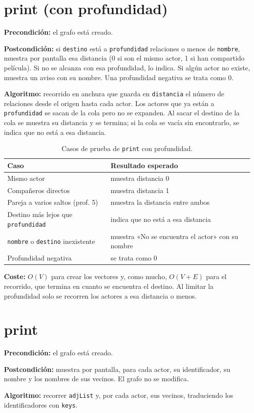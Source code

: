 \documentclass[a4paper,11pt]{report}
\newcommand{\coste}[1]{\par\noindent\textbf{Coste:} #1\par}
\newcommand{\espec}[2]{\par\noindent\textbf{Precondición:} #1\par\noindent\textbf{Postcondición:} #2\par}
\newcommand{\algoritmo}[1]{\par\noindent\textbf{Algoritmo:} #1\par}
\begin{document}
\section{\label{printProfundidad}print (con profundidad)}
\espec{el grafo está creado.}
{si \texttt{destino} está a \texttt{profundidad} relaciones o menos de \texttt{nombre}, muestra por pantalla esa distancia (0 si son el mismo actor, 1 si han compartido película). Si no se alcanza con esa profundidad, lo indica. Si algún actor no existe, muestra un aviso con su nombre. Una profundidad negativa se trata como 0.}
\algoritmo{recorrido en anchura que guarda en \texttt{distancia} el número de relaciones desde el origen hasta cada actor. Los actores que ya están a \texttt{profundidad} se sacan de la cola pero no se expanden. Al sacar el destino de la cola se muestra su distancia y se termina; si la cola se vacía sin encontrarlo, se indica que no está a esa distancia.}


\begin{table}[ht]
\centering
\begin{tabular}{p{5.2cm} p{8cm}}
\toprule
Caso & Resultado esperado \\
\midrule
Mismo actor & muestra distancia 0 \\
Compañeros directos & muestra distancia 1 \\
Pareja a varios saltos (prof. 5) & muestra la distancia entre ambos \\
Destino más lejos que \texttt{profundidad} & indica que no está a esa distancia \\
\texttt{nombre} o \texttt{destino} inexistente & muestra «No se encuentra el actor» con su nombre \\
Profundidad negativa & se trata como 0 \\
\bottomrule
\end{tabular}
\caption{Casos de prueba de \texttt{print} con profundidad.}
\end{table}

\coste{$O(V)$ para crear los vectores y, como mucho, $O(V+E)$ para el recorrido, que termina en cuanto se encuentra el destino. Al limitar la profundidad solo se recorren los actores a esa distancia o menos.}

\section{\label{print}print}
\espec{el grafo está creado.}
{muestra por pantalla, para cada actor, su identificador, su nombre y los nombres de sus vecinos. El grafo no se modifica.}
\algoritmo{recorrer \texttt{adjList} y, por cada actor, sus vecinos, traduciendo los identificadores con \texttt{keys}.}
\end{document}
